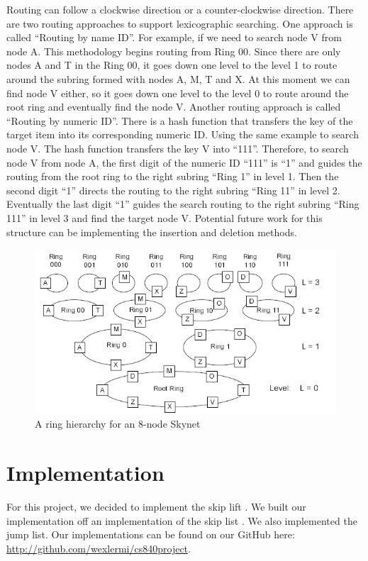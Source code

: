 \documentclass[oribibl]{llncs}
\begin{document}
Routing can follow a clockwise direction or a counter-clockwise direction. There are two routing approaches to support lexicographic searching. One approach is called “Routing by name ID”. For example, if we need to search node V from node A. This methodology begins routing from Ring 00. Since there are  only nodes A and T in the Ring 00, it goes down one level to the level 1 to route around the subring formed with nodes A, M, T and X. At this moment we can find node V either, so it goes down one level to the level 0 to route around the root ring and eventually find the node V. Another routing approach is called “Routing by numeric ID”. There is a hash function that transfers the key of the target item into its corresponding numeric ID. Using the same example to search node V. The hash function transfers the key V into “111”. Therefore, to search node V from node A, the first digit of the numeric ID “111” is “1” and guides the routing from the root ring to the right subring “Ring 1” in level 1. Then the second digit “1” directs the routing to the right subring “Ring 11” in level 2. Eventually the last digit “1” guides the search routing to the right subring “Ring 111” in level 3 and find the target node V. Potential future work for this structure can be implementing the insertion and deletion methods.

\begin{figure}[here]
\center
\includegraphics[width=12cm]{images/skynet1}
\caption{A ring hierarchy for an 8-node Skynet}
\label{fig:jumplist}
\end{figure}


\section{Implementation}
\label{sctn:implementation}

For this project, we decided to implement the skip lift \cite{skip_lift}. We built our implementation off an implementation of the skip list \cite{skip_list_imp}. We also implemented the jump list\cite{jump_list}.  Our implementations can be found on our GitHub here: \url{http://github.com/wexlermi/cs840project}.
\end{document}
